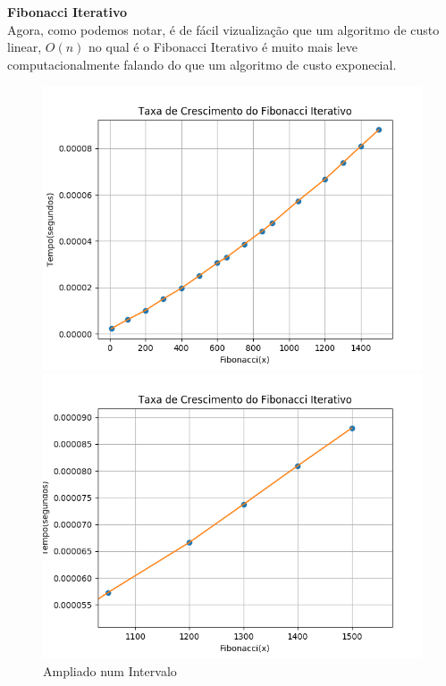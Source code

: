 \documentclass[a4paper, 12pt]{article}
\begin{document}
{\Large\bf Fibonacci Iterativo}\\

Agora, como podemos notar, é de fácil vizualização que um algoritmo de custo linear, $O(n)$ no qual é o Fibonacci Iterativo é muito mais leve computacionalmente falando do que um algoritmo de custo exponecial. 

\begin{figure}[h]
\centering
\begin{minipage}[b]{0.45\linewidth}
\includegraphics[width=\linewidth]{../fibonacci_iterativo.png}
\caption{Fibonacci Iterativo}
\end{minipage}
\hfill
\begin{minipage}[b]{0.45\linewidth}
\includegraphics[width=\linewidth]{../fibonacci_iterativo_zoom.png}
\caption{Ampliado num Intervalo}
\end{minipage}
\end{figure} 
\newpage
\end{document}
